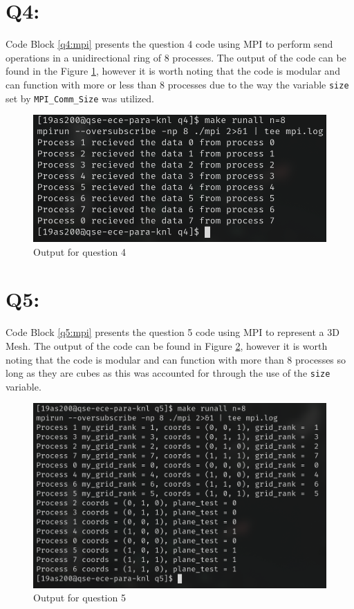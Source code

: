 \documentclass[11pt]{article}
\begin{document}
\section*{Q4:}
Code Block \ref{q4:mpi} presents the question 4 code using MPI to perform send operations in a unidirectional ring of 8 processes.
The output of the code can be found in the Figure \ref{fig:q4}, however it is worth noting that the code is modular and can function with more or less than 8 processes due to the way the variable \texttt{size} set by \texttt{MPI\_Comm\_Size} was utilized.



\begin{figure}[ht]
\centering
    \includegraphics[width=\textwidth]{./images/q4.png}
\caption{Output for question 4}
\label{fig:q4}
\end{figure}

\section*{Q5:}

Code Block \ref{q5:mpi} presents the question 5 code using MPI to represent a 3D Mesh.
The output of the code can be found in Figure \ref{fig:q5}, however it is worth noting that the code is modular and can function with more than 8 processes so long as they are cubes as this was accounted for through the use of the \texttt{size} variable.



\begin{figure}[ht]
\centering
    \includegraphics[width=\textwidth]{./images/q5.png}
\caption{Output for question 5}
\label{fig:q5}
\end{figure}
\end{document}
